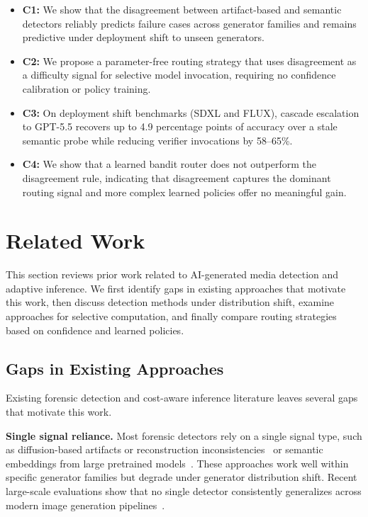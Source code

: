 \documentclass{ieeeaccess}
\begin{document}
\begin{itemize}
    \item \textbf{C1:} We show that the disagreement between artifact-based and semantic detectors reliably predicts failure cases across generator families and remains
    predictive under deployment shift to unseen generators.

    \item \textbf{C2:} We propose a parameter-free routing strategy that uses disagreement as a difficulty signal for selective model invocation, requiring no confidence
    calibration or policy training.

    \item \textbf{C3:} On deployment shift benchmarks (SDXL and FLUX), cascade escalation to GPT-5.5 recovers up to 4.9 percentage points of accuracy over a stale semantic probe while reducing verifier invocations by 58--65\%.

    \item \textbf{C4:} We show that a learned bandit router does not outperform the disagreement rule, indicating that disagreement captures the dominant routing signal and more complex learned policies offer no meaningful gain.
\end{itemize}


\section{Related Work}
This section reviews prior work related to AI-generated media detection and adaptive inference. We first identify gaps in existing approaches that motivate this work, then discuss detection methods under distribution shift, examine approaches for selective computation, and finally compare routing strategies based on confidence and learned policies.




\subsection{Gaps in Existing Approaches}

Existing forensic detection and cost-aware inference literature leaves several gaps that motivate this work.

\textbf{Single signal reliance.} Most forensic detectors rely on a single signal type, such as diffusion-based artifacts or reconstruction inconsistencies~\cite{Corvi_2023_ICASSP} or semantic embeddings from large pretrained models~\cite{cozzolino2023raising}. These approaches work well within specific generator families but degrade under generator distribution shift. Recent large-scale evaluations show that no single detector consistently generalizes across modern image generation pipelines~\cite{epstein2023online, cozzolino2023raising}.
\end{document}
